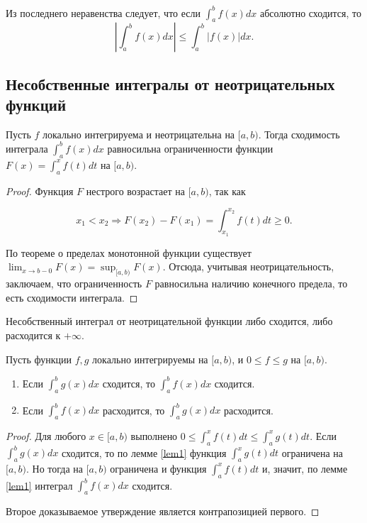 \begin{note}
    Из последнего неравенства следует, что если $\int_{a}^{b} f(x) dx$ абсолютно сходится, то 
    \[
        \left|\int_{a}^{b} f(x) dx \right| \leq \int_{a}^{b} |f(x)| dx.
    \]
\end{note}

\subsection{Несобственные интегралы от неотрицательных функций}

\begin{lemma}
    \label{lem1}
    Пусть $f$ локально интегрируема и неотрицательна на $[a, b)$. Тогда сходимость интеграла $\int_{a}^{b} f(x) dx$ равносильна ограниченности функции $F(x) = \int_{a}^{x} f(t) dt$ на $[a, b)$.
\end{lemma}

\begin{proof}
    Функция $F$ нестрого возрастает на $[a, b)$, так как
    
    \[
        x_{1} < x_{2} \Rightarrow F(x_{2}) - F(x_{1}) = \int_{x_{1}}^{x_{2}} f(t) dt \geq 0.
    \]
    
    По теореме о пределах монотонной функции существует $\lim_{x \to b - 0} F(x) = \sup_{[a, b)} F(x)$. Отсюда, учитывая неотрицательность, заключаем, что ограниченность $F$ равносильна наличию конечного предела, то есть сходимости интеграла.
\end{proof}

\begin{note}
    Несобственный интеграл от неотрицательной функции либо сходится, либо расходится к $+\infty$.
\end{note}

\begin{theorem}
    \label{compar_feat}
    Пусть функции $f, g$ локально интегрируемы на $[a, b)$, и $0 \leq f \leq g$ на $[a, b)$.
    \begin{enumerate}
        \item Если $\int_{a}^{b} g(x) dx$ сходится, то $\int_{a}^{b} f(x) dx$ сходится.
        \item Если $\int_{a}^{b} f(x) dx$ расходится, то $\int_{a}^{b} g(x) dx$ расходится.
    \end{enumerate}
\end{theorem}

\begin{proof}
     Для любого $x \in [a, b)$ выполнено $0 \leq \int_{a}^{x} f(t) dt \leq \int_{a}^{x} g(t) dt$. Если $\int_{a}^{b} g(x) dx$ сходится, то по лемме \ref{lem1} функция $\int_{a}^{x} g(t) dt$ ограничена на $[a, b)$. Но тогда на $[a, b)$ ограничена и функция $\int_{a}^{x} f(t) dt$ и, значит, по лемме \ref{lem1} интеграл $\int_{a}^{b} f(x) dx$ сходится.

     Второе доказываемое утверждение является контрапозицией первого.
\end{proof}

